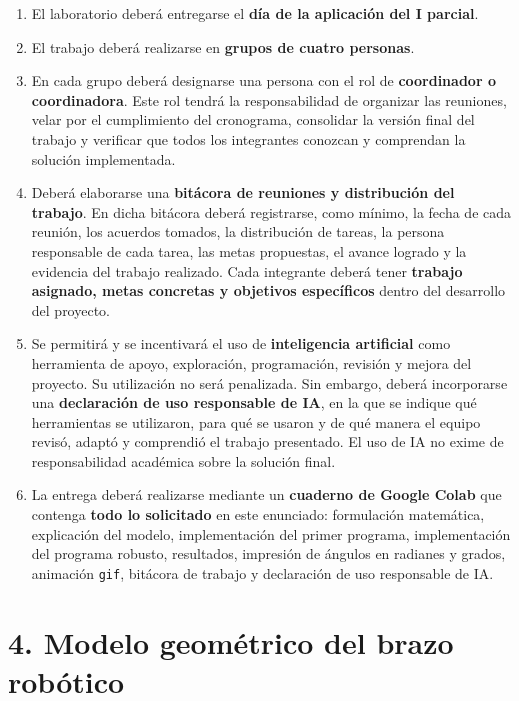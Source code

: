 \documentclass[12pt]{article}
\begin{document}
\begin{enumerate}[label=\arabic*.]
    \item El laboratorio deberá entregarse el \textbf{día de la aplicación del I parcial}.
    
    \item El trabajo deberá realizarse en \textbf{grupos de cuatro personas}.
    
    \item En cada grupo deberá designarse una persona con el rol de \textbf{coordinador o coordinadora}. Este rol tendrá la responsabilidad de organizar las reuniones, velar por el cumplimiento del cronograma, consolidar la versión final del trabajo y verificar que todos los integrantes conozcan y comprendan la solución implementada.
    
    \item Deberá elaborarse una \textbf{bitácora de reuniones y distribución del trabajo}. En dicha bitácora deberá registrarse, como mínimo, la fecha de cada reunión, los acuerdos tomados, la distribución de tareas, la persona responsable de cada tarea, las metas propuestas, el avance logrado y la evidencia del trabajo realizado. Cada integrante deberá tener \textbf{trabajo asignado, metas concretas y objetivos específicos} dentro del desarrollo del proyecto.
    
    \item Se permitirá y se incentivará el uso de \textbf{inteligencia artificial} como herramienta de apoyo, exploración, programación, revisión y mejora del proyecto. Su utilización no será penalizada. Sin embargo, deberá incorporarse una \textbf{declaración de uso responsable de IA}, en la que se indique qué herramientas se utilizaron, para qué se usaron y de qué manera el equipo revisó, adaptó y comprendió el trabajo presentado. El uso de IA no exime de responsabilidad académica sobre la solución final.
    
    \item La entrega deberá realizarse mediante un \textbf{cuaderno de Google Colab} que contenga \textbf{todo lo solicitado} en este enunciado: formulación matemática, explicación del modelo, implementación del primer programa, implementación del programa robusto, resultados, impresión de ángulos en radianes y grados, animación \texttt{gif}, bitácora de trabajo y declaración de uso responsable de IA.
\end{enumerate}

\section*{4. Modelo geométrico del brazo robótico}
\end{document}
